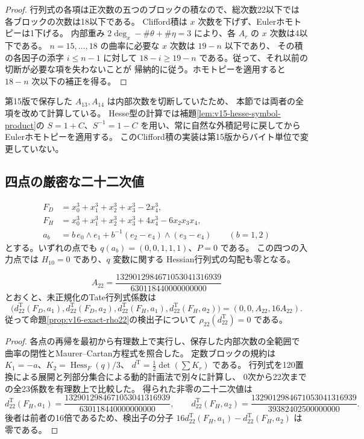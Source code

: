 \begin{proof}
行列式の各項は正次数の五つのブロックの積なので、総次数22以下では
各ブロックの次数は18以下である。
Clifford積は $x$ 次数を下げず、Eulerホモトピーは1下げる。
内部重み $2\deg_x-\#\theta+\#\eta=3$ により、各 $A_r$ の
$x$ 次数は4以下である。
$n=15,\ldots,18$ の曲率に必要な $x$ 次数は $19-n$ 以下であり、
その積の各因子の添字 $i\le n-1$ に対して
$18-i\ge19-n$ である。従って、それ以前の切断が必要な項を失わないことが
帰納的に従う。ホモトピーを適用すると $18-n$ 次以下の補正を得る。
\end{proof}

第15版で保存した $A_{13},A_{14}$ は内部次数を切断していたため、
本節では両者の全項を改めて計算している。
Hesse型の計算では補題\ref{lem:v15-hesse-symbol-product}の
$S=1+C$、$S^{-1}=1-C$ を用い、常に自然な外積記号に戻してから
Eulerホモトピーを適用する。
このClifford積の実装は第15版からバイト単位で変更していない。

\subsection{四点の厳密な二十二次値}

\[
\begin{split}
 F_D&=x_0^3+x_1^3+x_2^3+x_3^3-2x_4^3,\\
 F_H&=x_0^3+x_1^3+x_2^3+x_3^3+4x_4^3-6x_2x_3x_4,\\
 a_b&=b\,e_0\wedge e_1+
       b^{-1}(e_2-e_4)\wedge(e_3-e_4)\qquad(b=1,2)
\end{split}
\]
とする。いずれの点でも $q(a_b)=(0,0,1,1,1)$、$P=0$ である。
この四つの入力点では $H_{10}=0$ であり、$q$ 変数に関する
Hessian行列式の勾配も零となる。

\begin{proposition}[新規再構成による四点の二十二次係数]
\label{prop:v16-fresh-tate22-values}
\[
 A_{22}=\frac{1329012984671053041316939}{630118440000000000}
\]
とおくと、未正規化のTate行列式係数は
\[
\boxed{\bigl(d_{22}^{\mathrm T}(F_D,a_1),d_{22}^{\mathrm T}(F_D,a_2),
             d_{22}^{\mathrm T}(F_H,a_1),d_{22}^{\mathrm T}(F_H,a_2)\bigr)
       =(0,0,A_{22},16A_{22}).}
\]
従って命題\ref{prop:v16-exact-rho22}の検出子について
$\rho_{22}(d_{22}^{\mathrm T})=0$ である。
\end{proposition}

\begin{proof}
各点の再帰を最初から有理数上で実行し、保存した内部次数の全範囲で
曲率の閉性とMaurer--Cartan方程式を照合した。
定数ブロックの規約は $K_1=-a$、$K_2=\operatorname{Hess}_F(q)/3$、
$d^{\mathrm T}=\frac12\det(\sum K_r)$ である。
行列式を120置換による展開と列部分集合による動的計画法で別々に計算し、
0次から22次までの全23係数を有理数上で比較した。
得られた非零の二十二次値は
\[
 d_{22}^{\mathrm T}(F_H,a_1)
   =\frac{1329012984671053041316939}{630118440000000000},\qquad
 d_{22}^{\mathrm T}(F_H,a_2)
   =\frac{1329012984671053041316939}{39382402500000000}.
\]
後者は前者の16倍であるため、検出子の分子
$16d_{22}^{\mathrm T}(F_H,a_1)-d_{22}^{\mathrm T}(F_H,a_2)$ は零である。
\end{proof}

